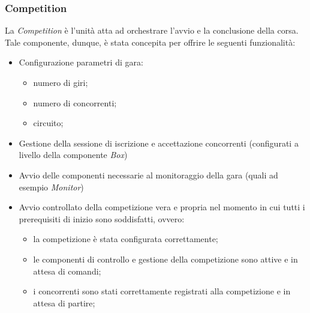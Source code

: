 \subsubsection{Competition}
La \emph{Competition} \`{e} l'unit\`{a} atta ad orchestrare l'avvio e la conclusione della corsa. Tale componente, dunque, \`{e} stata concepita per 
offrire le seguenti funzionalit\`{a}:
\begin{itemize}
\item Configurazione parametri di gara:
	\begin{itemize}
		\item numero di giri;
		\item numero di concorrenti;
		\item circuito;
	\end{itemize}
\item Gestione della sessione di iscrizione e accettazione concorrenti (configurati a livello della componente \emph{Box})
\item Avvio delle componenti necessarie al monitoraggio della gara (quali ad esempio \emph{Monitor})
\item Avvio controllato della competizione vera e propria nel momento in cui tutti i prerequisiti di inizio sono soddisfatti, ovvero:
\begin{itemize}
\item la competizione \`{e} stata configurata correttamente;
\item le componenti di controllo e gestione della competizione sono attive e in attesa di comandi;
\item i concorrenti sono stati correttamente registrati alla competizione e in attesa di partire;
\end{itemize}
\end{itemize}
